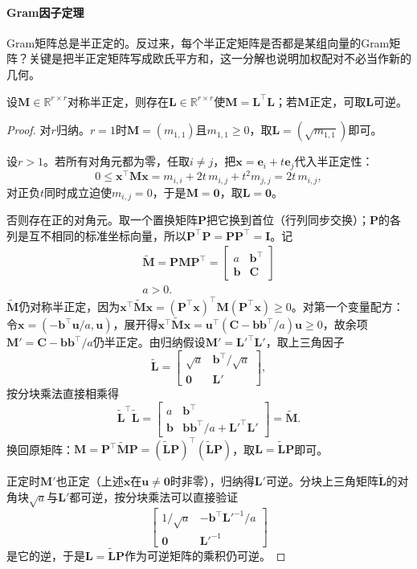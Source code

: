 \paragraph{Gram因子定理}
Gram矩阵总是半正定的。反过来，每个半正定矩阵是否都是某组向量的Gram矩阵？关键是把半正定矩阵写成欧氏平方和，这一分解也说明加权配对不必当作新的几何。
\begin{theorem}[半正定矩阵的配方因子]
\label{thm:ls-gram-factor}
设$\bm M\in\mathbb R^{r\times r}$对称半正定，则存在$\bm L\in\mathbb R^{r\times r}$使$\bm M=\bm L^\top\bm L$；若$\bm M$正定，可取$\bm L$可逆。
\end{theorem}
\begin{proof}
对$r$归纳。$r=1$时$\bm M=(m_{1,1})$且$m_{1,1}\geq0$，取$\bm L=(\sqrt{m_{1,1}})$即可。

设$r>1$。若所有对角元都为零，任取$i\neq j$，把$\bm x=\bm e_i+t\bm e_j$代入半正定性：
\[
 0\leq\bm x^\top\bm M\bm x=m_{i,i}+2t\,m_{i,j}+t^2m_{j,j}=2t\,m_{i,j},
\]
对正负$t$同时成立迫使$m_{i,j}=0$，于是$\bm M=\bm0$，取$\bm L=\bm0$。

否则存在正的对角元。取一个置换矩阵$\bm P$把它换到首位（行列同步交换）；$\bm P$的各列是互不相同的标准坐标向量，所以$\bm P^\top\bm P=\bm P\bm P^\top=\bm I$。记
\[
\begin{gathered}
\widetilde{\bm M}=\bm P\bm M\bm P^\top
 =\begin{bmatrix}a&\bm b^\top\\ \bm b&\bm C\end{bmatrix}\\
a>0.
\end{gathered}
\]
$\widetilde{\bm M}$仍对称半正定，因为$\bm x^\top\widetilde{\bm M}\bm x=(\bm P^\top\bm x)^\top\bm M(\bm P^\top\bm x)\geq0$。对第一个变量配方：令$\bm x=(-\bm b^\top\bm u/a,\bm u)$，展开得$\bm x^\top\widetilde{\bm M}\bm x=\bm u^\top(\bm C-\bm b\bm b^\top/a)\bm u\geq0$，故余项$\bm M'=\bm C-\bm b\bm b^\top/a$仍半正定。由归纳假设$\bm M'=\bm L'^\top\bm L'$，取上三角因子
\[
 \widetilde{\bm L}=\begin{bmatrix}\sqrt a&\bm b^\top/\sqrt a\\ \bm0&\bm L'\end{bmatrix},
\]
按分块乘法直接相乘得
\[
 \widetilde{\bm L}^\top\widetilde{\bm L}
 =\begin{bmatrix}a&\bm b^\top\\ \bm b&\bm b\bm b^\top/a+\bm L'^\top\bm L'\end{bmatrix}
 =\widetilde{\bm M}.
\]
换回原矩阵：$\bm M=\bm P^\top\widetilde{\bm M}\bm P=(\widetilde{\bm L}\bm P)^\top(\widetilde{\bm L}\bm P)$，取$\bm L=\widetilde{\bm L}\bm P$即可。

正定时$\bm M'$也正定（上述$\bm x$在$\bm u\neq\bm0$时非零），归纳得$\bm L'$可逆。分块上三角矩阵$\widetilde{\bm L}$的对角块$\sqrt a$与$\bm L'$都可逆，按分块乘法可以直接验证
\[
 \begin{bmatrix}1/\sqrt a&-\bm b^\top\bm L'^{-1}/a\\ \bm0&\bm L'^{-1}\end{bmatrix}
\]
是它的逆，于是$\bm L=\widetilde{\bm L}\bm P$作为可逆矩阵的乘积仍可逆。
\end{proof}
